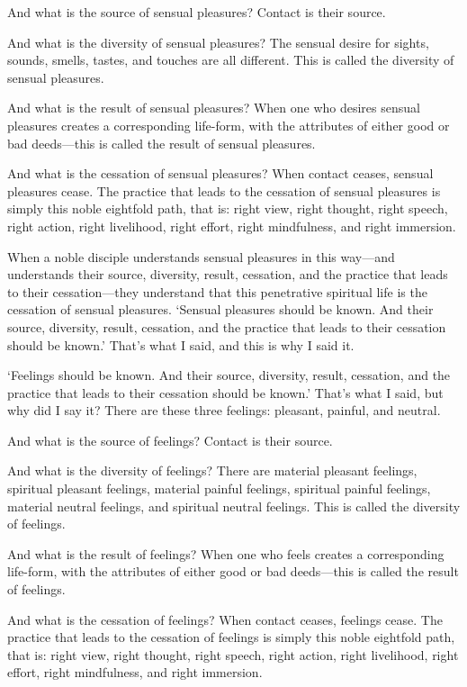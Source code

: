\documentclass[12pt,openany]{book}%
\begin{document}
And what is the source of sensual pleasures? Contact is their source. 

And what is the diversity of sensual pleasures? The sensual desire for sights, sounds, smells, tastes, and touches are all different. This is called the diversity of sensual pleasures. 

And what is the result of sensual pleasures? When one who desires sensual pleasures creates a corresponding life-form, with the attributes of either good or bad deeds—this is called the result of sensual pleasures. 

And what is the cessation of sensual pleasures? When contact ceases, sensual pleasures cease. The practice that leads to the cessation of sensual pleasures is simply this noble eightfold path, that is: right view, right thought, right speech, right action, right livelihood, right effort, right mindfulness, and right immersion. 

When a noble disciple understands sensual pleasures in this way—and understands their source, diversity, result, cessation, and the practice that leads to their cessation—they understand that this penetrative spiritual life is the cessation of sensual pleasures. ‘Sensual pleasures should be known. And their source, diversity, result, cessation, and the practice that leads to their cessation should be known.’ That’s what I said, and this is why I said it. 

‘Feelings should be known. And their source, diversity, result, cessation, and the practice that leads to their cessation should be known.’ That’s what I said, but why did I say it? There are these three feelings: pleasant, painful, and neutral. 

And what is the source of feelings? Contact is their source. 

And what is the diversity of feelings? There are material pleasant feelings, spiritual pleasant feelings, material painful feelings, spiritual painful feelings, material neutral feelings, and spiritual neutral feelings. This is called the diversity of feelings. 

And what is the result of feelings? When one who feels creates a corresponding life-form, with the attributes of either good or bad deeds—this is called the result of feelings. 

And what is the cessation of feelings? When contact ceases, feelings cease. The practice that leads to the cessation of feelings is simply this noble eightfold path, that is: right view, right thought, right speech, right action, right livelihood, right effort, right mindfulness, and right immersion. 
\end{document}
